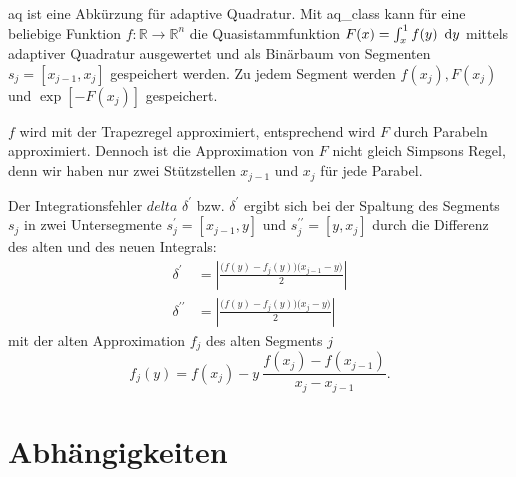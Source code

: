 aq ist eine Abkürzung für adaptive Quadratur. Mit aq\_class kann für eine beliebige Funktion $f:\mathbb{R}\rightarrow\mathbb{R}^n$ die Quasistammfunktion $F(x)=\int_x^1 f(y)\ \der\!y$ mittels adaptiver Quadratur ausgewertet und als Binärbaum von Segmenten $s_j=[x_{j-1},x_j]$ gespeichert werden. Zu jedem Segment werden $f(x_j),F(x_j)$ und $\exp[-F(x_j)]$ gespeichert.

$f$ wird mit der Trapezregel approximiert, entsprechend wird $F$ durch Parabeln approximiert. Dennoch ist die Approximation von $F$ nicht gleich Simpsons Regel, denn wir haben nur zwei Stützstellen $x_{j-1}$ und $x_j$ für jede Parabel.

Der Integrationsfehler $delta$ $\delta^\prime$ bzw. $\delta^\prime$ ergibt sich bei der Spaltung des Segments $s_j$ in zwei Untersegmente $s_j^\prime=[x_{j-1},y]$ und $s_j^{\prime\prime}=[y,x_j]$ durch die Differenz des alten und des neuen Integrals:
\begin{align}
  \delta^{\prime}&=\left|\frac{\big(f(y)-f_j(y)\big)\big(x_{j-1}-y\big)}{2}\right|\\
  \delta^{\prime\prime}&=\left|\frac{\big(f(y)-f_j(y)\big)\big(x_j-y\big)}{2}\right|
\end{align}
mit der alten Approximation $f_j$ des alten Segments $j$
\begin{equation}
  f_j(y)=f(x_j)-y\ \frac{f(x_j)-f(x_{j-1})}{x_j-x_{j-1}}.
\end{equation}
\section{Abhängigkeiten}
